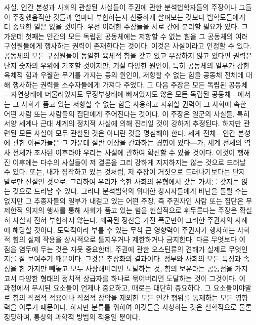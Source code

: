 사실,
인간 본성과 사회의 관찰된 사실들이
주권에 관한
분석법학자들의 주장이나 그들이 주장했음직한 것들과
얼마나 부합하는지 신중하게 살펴보는 것보다
법학도들에게
더 중요한 일은 없을 것이다.
우선 이러한 주장들을 서로 간에 분리할 필요가 있다.
그 가운데 첫째는 인간의 모든 독립된 공동체에는
저항할 수 없는 힘을
그 공동체의 여러 구성원들에게 행사하는
권력이 존재한다는 것이다.
이것은 사실이라고 인정할 수 있다.
공동체의 모든 구성원들이 동일한 육체적 힘을 갖고 있고
무장하지 않고 있다면
권력은 단지 숫자의 우위에 기초할 것이지만,
기실 다양한 원인이, 특히 공동체의 일부가 강한 육체적 힘과
우월한 무기를 가지는 등의 원인이,
저항할 수 없는 힘을
공동체 전체에 대해 행사하는
권력을
소수자들에게
가져다 주었다.
그 다음 주장은
모든 독립된 공동체---자연상태에
머물러있지도 무정부상태에 빠져있지도 않은 모든
독립된 공동체---에서는
그 사회가 품고 있는 저항할 수 없는 힘을 사용하고 지휘할 권력이
그 사회에 속한
어떤 사람 또는 사람들의 집단에게 주어진다는 것이다.
이 주장은 일군의 사실들, 특히 서양 세계나 근대 세계의 정치적 사실에 의해
진리일 것이 강하게 추정된다.
하지만 관련된 모든 사실이 모두 관찰된 것은 아니란 것을 명심해야 한다.
세계 전체---인간 본성에 관한 이론가들은 그 가운데 절반 이상을
간과하는 경향이 있다---가,
세계 전체의 역사 전체가
조사된 이후라야
우리는 사실에 관하여 확신할 수 있을 것이다.
이것이 행해진 이후에는
다수의 사실들이 저 결론을 그리 강하게 지지하지는 않는 것으로 드러날 수 있다.
또는, 내가 짐작하고 있는 것처럼,
저 주장이 거짓으로 드러나기보다는
단지 말로만 진실인 것으로, 그리하여
우리가 속한 사회의 유형에서 갖는 가치를 갖지는 않는 것으로 드러날 수 있다.
그러나
분석법학의 위대한 창시자들에게 비난을 돌릴 수는 없지만
그 추종자들의 일부가 내걸고 있는 어떤 주장, 즉
주권자인 사람 또는 집단은 무제한적 의지의 행사를 통해
사회가 품고 있는 힘을 현실적으로 휘두른다는 주장은
확실히 사실과 전혀 부합하지 않는다.
왜곡된 정신을 가진 폭군만이 그러한 주권자의 사례에 해당할 것이다.
도덕적이라 부를 수 있는 무척 큰 영향력이
주권자가 행사하는 사회적 힘의 실제 작용을 상시적으로 틀지우거나
제한하거나 금지한다.
다른 무엇보다 이 점을 염두에 두는 것은 자못 중요한데,
주권에 관한 오스틴류의 견해가 실제로 무엇인지를 잘 보여주기 때문이다.
그것은 추상화의 결과이다.
정부와 사회의 모든 특징과 속성을 한 가지만 빼놓고 모두
사상해버리면 도달하는 것,
힘의 보유라는 공통점을 가지고서 다양한 형태의 정치적 상급자를 하나로 묶어버리면
도달하는 것이 그것이다.
이 과정에서 무시된 요소들이 언제나 중요하고, 때로는 대단히 중요하다.
그 요소들이야말로
힘의 직접적 적용이나 직접적 장악을 제외한 모든 인간 행위를
통제하는 모든 영향력을 이루기 때문이다.
하지만
분류를 위하여 이것들을 사상하는 것은
철학적으로 물론 정당하며,
통상의 과학적 방법의 적용일 뿐이다.

